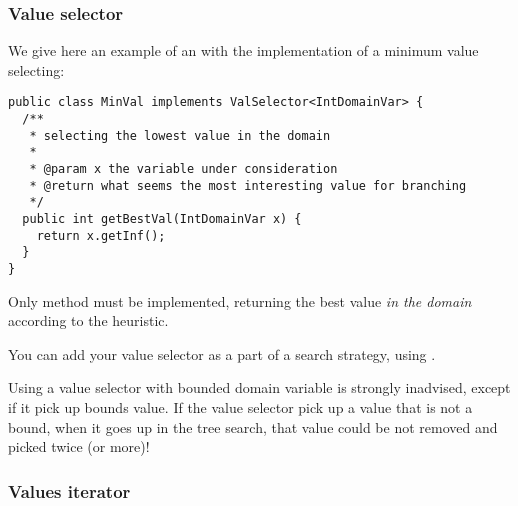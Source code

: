 \subsubsection{Value selector}\label{advanced:valueselector}\hypertarget{advanced:valueselector}{}


We give here an example of an  with the implementation of a minimum value selecting:
\begin{lstlisting}
public class MinVal implements ValSelector<IntDomainVar> {
  /**
   * selecting the lowest value in the domain
   *
   * @param x the variable under consideration
   * @return what seems the most interesting value for branching
   */
  public int getBestVal(IntDomainVar x) {
    return x.getInf();
  }
}
\end{lstlisting}
Only  method must be implemented, returning the best value \emph{in the domain} according to the heuristic.

You can add your value selector as a part of a search strategy, using .

\begin{note}
Using a value selector with bounded domain variable is strongly inadvised, except if it pick up bounds value. If the value selector pick up a value that is not a bound, when it goes up in the tree search, that value could be not removed and picked twice (or more)!
\end{note} 

\subsubsection{Values iterator}\label{advanced:valuesiterator}\hypertarget{advanced:valuesiterator}{}


